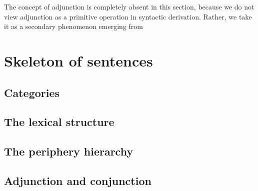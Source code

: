 \documentclass[a4paper]{article}
\begin{document}
The concept of adjunction is completely absent in this section, because we do not view adjunction as a primitive operation in syntactic derivation. Rather, we take it as a secondary phenomenon emerging from %

\section{Skeleton of sentences}

\subsection{Categories}

\subsection{The lexical structure}


\subsection{The periphery hierarchy}


\subsection{Adjunction and conjunction}

\end{document}
